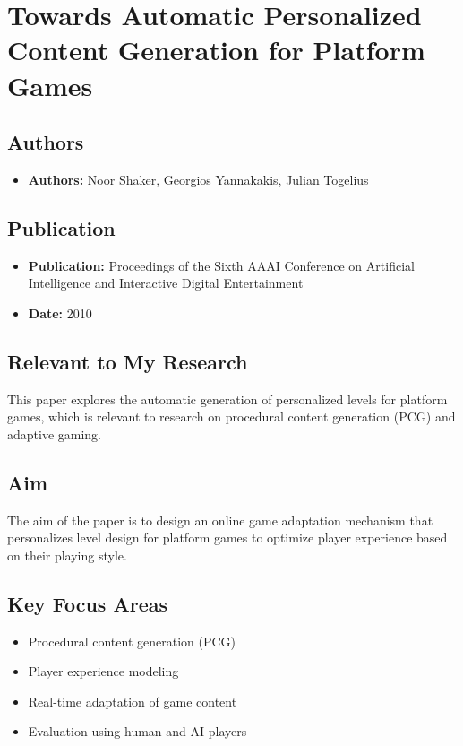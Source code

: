\section{Towards Automatic Personalized Content Generation for Platform Games}

\subsection{Authors}
\begin{itemize}
    \item \textbf{Authors:} Noor Shaker, Georgios Yannakakis, Julian Togelius
\end{itemize}

\subsection{Publication}
\begin{itemize}
    \item \textbf{Publication:} Proceedings of the Sixth AAAI Conference on Artificial Intelligence and Interactive Digital Entertainment
    \item \textbf{Date:} 2010
\end{itemize}

\subsection{Relevant to My Research}
This paper explores the automatic generation of personalized levels for platform games, which is relevant to research on procedural content generation (PCG) and adaptive gaming.

\subsection{Aim}
The aim of the paper is to design an online game adaptation mechanism that personalizes level design for platform games to optimize player experience based on their playing style.

\subsection{Key Focus Areas}
\begin{itemize}
    \item Procedural content generation (PCG)
    \item Player experience modeling
    \item Real-time adaptation of game content
    \item Evaluation using human and AI players
\end{itemize}

